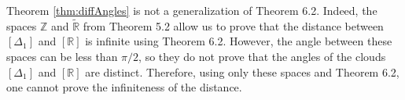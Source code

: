 \begin{remark}
  Theorem \ref{thm:diffAngles} is not a generalization of Theorem
  6.2. Indeed, the spaces \(\mathbb Z\) and \(\widetilde{\mathbb R}\)
  from Theorem 5.2 allow us to prove that the distance between
  \([\Delta_1]\) and \([\mathbb R]\) is infinite using Theorem 6.2.
  However, the angle between these spaces can be less than \(\pi/2\),
  so they do not prove that the angles of the clouds \([\Delta_1]\)
  and \([\mathbb R]\) are distinct. Therefore, using only these
  spaces and Theorem 6.2, one cannot prove the infiniteness of the distance.
\end{remark}
